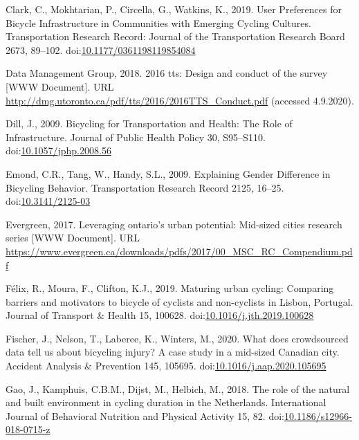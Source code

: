 \documentclass[]{elsarticle} %
\begin{document}
\leavevmode\hypertarget{ref-clarkUserPreferencesBicycle2019a}{}%
Clark, C., Mokhtarian, P., Circella, G., Watkins, K., 2019. User
Preferences for Bicycle Infrastructure in Communities with Emerging
Cycling Cultures. Transportation Research Record: Journal of the
Transportation Research Board 2673, 89--102.
doi:\href{https://doi.org/10.1177/0361198119854084}{10.1177/0361198119854084}

\leavevmode\hypertarget{ref-Dmg2018tts}{}%
Data Management Group, 2018. 2016 tts: Design and conduct of the survey
{[}WWW Document{]}. URL
\url{http://dmg.utoronto.ca/pdf/tts/2016/2016TTS_Conduct.pdf} (accessed
4.9.2020).

\leavevmode\hypertarget{ref-dillBicyclingTransportationHealth2009}{}%
Dill, J., 2009. Bicycling for Transportation and Health: The Role of
Infrastructure. Journal of Public Health Policy 30, S95--S110.
doi:\href{https://doi.org/10.1057/jphp.2008.56}{10.1057/jphp.2008.56}

\leavevmode\hypertarget{ref-emondExplainingGenderDifference2009}{}%
Emond, C.R., Tang, W., Handy, S.L., 2009. Explaining Gender Difference
in Bicycling Behavior. Transportation Research Record 2125, 16--25.
doi:\href{https://doi.org/10.3141/2125-03}{10.3141/2125-03}

\leavevmode\hypertarget{ref-evergreenleveraging2017}{}%
Evergreen, 2017. Leveraging ontario's urban potential: Mid-sized cities
research series {[}WWW Document{]}. URL
\url{https://www.evergreen.ca/downloads/pdfs/2017/00_MSC_RC_Compendium.pdf}

\leavevmode\hypertarget{ref-felixMaturingUrbanCycling2019}{}%
Félix, R., Moura, F., Clifton, K.J., 2019. Maturing urban cycling:
Comparing barriers and motivators to bicycle of cyclists and
non-cyclists in Lisbon, Portugal. Journal of Transport \& Health 15,
100628.
doi:\href{https://doi.org/10.1016/j.jth.2019.100628}{10.1016/j.jth.2019.100628}

\leavevmode\hypertarget{ref-fischerWhatDoesCrowdsourced2020}{}%
Fischer, J., Nelson, T., Laberee, K., Winters, M., 2020. What does
crowdsourced data tell us about bicycling injury? A case study in a
mid-sized Canadian city. Accident Analysis \& Prevention 145, 105695.
doi:\href{https://doi.org/10.1016/j.aap.2020.105695}{10.1016/j.aap.2020.105695}

\leavevmode\hypertarget{ref-gaoRoleNaturalBuilt2018}{}%
Gao, J., Kamphuis, C.B.M., Dijst, M., Helbich, M., 2018. The role of the
natural and built environment in cycling duration in the Netherlands.
International Journal of Behavioral Nutrition and Physical Activity 15,
82.
doi:\href{https://doi.org/10.1186/s12966-018-0715-z}{10.1186/s12966-018-0715-z}
\end{document}
